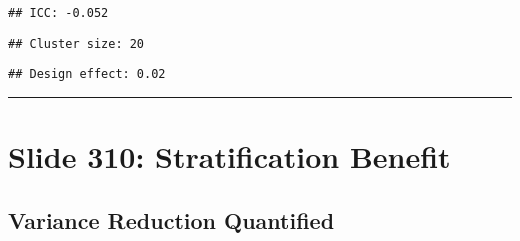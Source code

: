 \documentclass[
]{article}
\newenvironment{Shaded}{\begin{snugshade}}{\end{snugshade}}
\newcommand{\DecValTok}[1]{\textcolor[rgb]{0.00,0.00,0.81}{#1}}
\newcommand{\FunctionTok}[1]{\textcolor[rgb]{0.13,0.29,0.53}{\textbf{#1}}}
\newcommand{\NormalTok}[1]{#1}
\newcommand{\OtherTok}[1]{\textcolor[rgb]{0.56,0.35,0.01}{#1}}
\newcommand{\SpecialCharTok}[1]{\textcolor[rgb]{0.81,0.36,0.00}{\textbf{#1}}}
\newcommand{\StringTok}[1]{\textcolor[rgb]{0.31,0.60,0.02}{#1}}
\begin{document}
\begin{Shaded}
\end{Shaded}

\begin{verbatim}
## ICC: -0.052
\end{verbatim}

\begin{Shaded}
\end{Shaded}

\begin{verbatim}
## Cluster size: 20
\end{verbatim}

\begin{Shaded}
\end{Shaded}

\begin{verbatim}
## Design effect: 0.02
\end{verbatim}

\begin{center}\rule{0.5\linewidth}{0.5pt}\end{center}

\section{Slide 310: Stratification
Benefit}\label{slide-310-stratification-benefit}

\subsection{Variance Reduction
Quantified}\label{variance-reduction-quantified-1}
\end{document}
